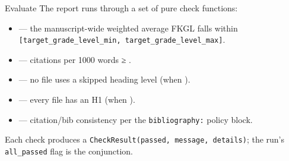 \documentclass[
  ignorenonframetext,
]{beamer}
\providecommand{\tightlist}{%
  \setlength{\itemsep}{0pt}\setlength{\parskip}{0pt}}
\begin{document}
\begin{frame}{Evaluate}
\protect{}\label{evaluate}
The report runs through a set of pure check functions:

\begin{itemize}
\tightlist
\item
   --- the manuscript-wide weighted
  average FKGL falls within
  \texttt{{[}target\_grade\_level\_min,\ target\_grade\_level\_max{]}}.
\item
   --- citations per 1000 words ≥
  .
\item
   --- no file uses a skipped
  heading level (when ).
\item
   --- every file has an H1 (when
  ).
\item
   --- citation/bib consistency per the
  \texttt{bibliography:} policy block.
\end{itemize}

Each check produces a \texttt{CheckResult(passed,\ message,\ details)};
the run's \texttt{all\_passed} flag is the conjunction.
\end{frame}
\end{document}
